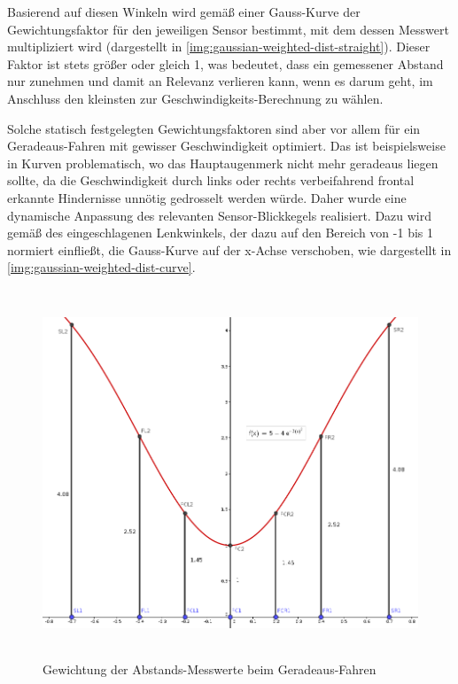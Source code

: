 \documentclass[12pt, a4paper]{scrartcl}
\begin{document}
Basierend auf diesen Winkeln wird gemäß einer Gauss-Kurve der Gewichtungsfaktor für den jeweiligen Sensor bestimmt, mit dem dessen Messwert multipliziert wird (dargestellt in \autoref{img:gaussian-weighted-dist-straight}). Dieser Faktor ist stets größer oder gleich 1, was bedeutet, dass ein gemessener Abstand nur zunehmen und damit an Relevanz verlieren kann, wenn es darum geht, im Anschluss den kleinsten zur Geschwindigkeits-Berechnung zu wählen.

Solche statisch festgelegten Gewichtungsfaktoren sind aber vor allem für ein Geradeaus-Fahren mit gewisser Geschwindigkeit optimiert. Das ist beispielsweise in Kurven problematisch, wo das Hauptaugenmerk nicht mehr geradeaus liegen sollte, da die Geschwindigkeit durch links oder rechts verbeifahrend frontal erkannte Hindernisse unnötig gedrosselt werden würde. Daher wurde eine dynamische Anpassung des relevanten Sensor-Blickkegels realisiert. Dazu wird gemäß des eingeschlagenen Lenkwinkels, der dazu auf den Bereich von -1 bis 1 normiert einfließt, die Gauss-Kurve auf der x-Achse verschoben, wie dargestellt in \autoref{img:gaussian-weighted-dist-curve}.

\begin{figure}[ht]
	\centering
	\includegraphics[width=\textwidth, height=11cm, keepaspectratio]{Bilder/Gauss_Sensorgewichtung_gerade.png}
	\caption{Gewichtung der Abstands-Messwerte beim Geradeaus-Fahren}
	\label{img:gaussian-weighted-dist-straight}
\end{figure}
\end{document}
